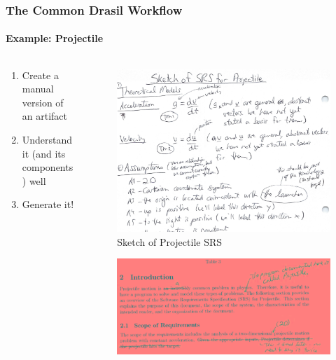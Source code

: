 \documentclass{beamer}
\begin{document}
\begin{frame}
    \frametitle{The Common Drasil Workflow}
    \framesubtitle{Example: Projectile}

    \begin{columns}[T,onlytextwidth]
        \begin{column}{.25\textwidth}
            \begin{enumerate}
                \item<2-|handout:1-> Create a manual version of an artifact
                \item<3-|handout:2-> Understand it (and its components) well
                \item<4-|handout:3> Generate it!
            \end{enumerate}
        \end{column}
        \begin{column}{.75\textwidth}
            \begin{overprint}
                \centering
                \begin{figure}
                    \centering\includegraphics[width=.8\textwidth]{assets/projectile-sketch.PNG}
                    \caption{Sketch of Projectile SRS \tiny \cite{projectile_sketch}}
                \end{figure}
                \begin{figure}
                    \centering\includegraphics[width=.9\textwidth]{assets/projectile-wip.PNG}

\end{figure}
\end{overprint}
\end{column}
\end{columns}
\end{frame}
\end{document}
